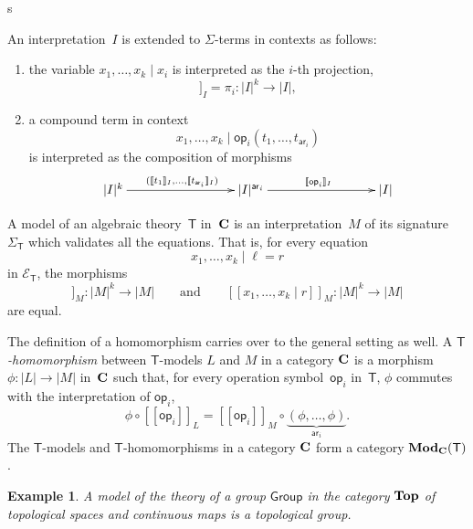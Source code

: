 s\documentclass{amsart}
\newcommand{\theory}[1]{\mathsf{#1}} %
\newcommand{\signature}[1]{\Sigma_{\theory{#1}}} %
\newcommand{\equations}[1]{\mathcal{E}_{\theory{#1}}} %
\newcommand{\ModC}[2]{\text{\textbf{Mod}}_{\category{#1}}(\theory{#2})} %
\newcommand{\category}[1]{\text{\textbf{#1}}} %
\newcommand{\carrier}[1]{|#1|} %
\newcommand{\op}[1]{\mathsf{op}_{#1}} %
\newcommand{\arity}[1]{\mathsf{ar}_{#1}} %
\newcommand{\sem}[1]{[\![#1]\!]} %
\newtheorem{example}[definition]{Example}
\begin{document}
An interpretation~$I$ is extended to $\Sigma$-terms in contexts as follows:
%
\begin{enumerate}
\item the variable $x_1, \ldots, x_k \mid x_i$ is interpreted as the $i$-th projection,
  \begin{equation*}
    \sem{x_1, \ldots, x_k \mid  x_i}_I = \pi_i : \carrier{I}^k \to \carrier{I},
  \end{equation*}
\item a compound term in context
  \begin{equation*}
    x_1, \ldots, x_k \mid \op{i}(t_1, \ldots, t_{\arity{i}})
  \end{equation*}
  is interpreted as the composition of morphisms
  \begin{equation*}
    \xymatrix@+6em{
      {\carrier{I}^k} \ar[r]^{(\sem{t_1}_I, \ldots, \sem{t_{\arity{i}}}_I)}
      &
      {\carrier{I}^{\arity{i}}} \ar[r]^{\sem{\op{i}}_I}
      &
      {\carrier{I}}
    }
  \end{equation*}
\end{enumerate}
%
A model of an algebraic theory~$\theory{T}$ in~$\category{C}$ is an interpretation~$M$ of
its signature $\signature{T}$ which validates all the equations. That is, for every
equation
%
\begin{equation*}
  x_1, \ldots, x_k \mid \ell = r
\end{equation*}
%
in $\equations{T}$, the morphisms
%
\begin{equation*}
  \sem{x_1, \ldots, x_k \mid \ell}_M : \carrier{M}^k \to \carrier{M}
  \qquad\text{and}\qquad
  \sem{x_1, \ldots, x_k \mid r}_M : \carrier{M}^k \to \carrier{M}
\end{equation*}
%
are equal.

The definition of a homomorphism carries over to the general setting as well. A
\emph{$\theory{T}$-homomorphism} between $\theory{T}$-models $L$ and $M$ in a category
$\category{C}$ is a morphism $\phi : \carrier{L} \to \carrier{M}$ in~$\category{C}$ such that, for every
operation symbol~$\op{i}$ in~$\theory{T}$, $\phi$ commutes with the interpretation of
$\op{i}$,
%
\begin{equation*}
  \phi \circ \sem{\op{i}}_L = \sem{\op{i}}_M \circ \underbrace{(\phi, \ldots, \phi)}_{\arity{i}}.
\end{equation*}
%
The $\theory{T}$-models and $\theory{T}$-homomorphisms in a category $\category{C}$ form a
category $\ModC{C}{T}$.

\begin{example}
  A model of the theory of a group $\theory{Group}$ in the category $\category{Top}$ of
  topological spaces and continuous maps is a topological group.
\end{example}
\end{document}
